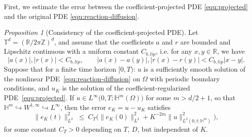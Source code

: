 \documentclass[a4paper,fleqn]{cas-sc}
\theoremstyle{definition}
\theoremstyle{remark}
\newtheorem{proposition}{Proposition}
\begin{document}
First, we estimate the error between the coefficient-projected PDE \eqref{equ:projected} and the original PDE \eqref{equ:reaction-diffusion}.
\begin{proposition}[Consistency of the coefficient-projected PDE]
\label{prop:u_u_K}
Let $\mathbb{T}^d = (\mathbb{R}/2\pi\mathbb{Z})^d$, and assume that the coefficients $a$ and $r$ are bounded and Lipschitz continuous with a uniform constant $C_{b,lip}$, i.e. for any $x, y\in \mathbb R$, we have
    \[
    |a(x)|,|r(x)| < C_{b,lip}, \qquad |a(x)-a(y)|,|r(x)-r(y)| < C_{b,lip} |x-y|.
    \]
    Suppose that for a finite time horizon $[0,T)$: $u$ is a sufficiently smooth solution of the nonlinear PDE~\eqref{equ:reaction-diffusion} on $\Omega$ with periodic boundary conditions, and $u_K$ is the solution of the coefficient-regularized PDE~\eqref{equ:projected}.
If $u\in L^\infty\bigl(0,T;\mathbb H^m(\Omega)\bigr)$ for some $m>d/2+1$, so that $\mathbb H^m\hookrightarrow W^{1,\infty}\hookrightarrow L^\infty$, then the error $e_K=u- u_K$ satisfies
\[
\|e_K(t)\|_{L^2}^2 \;\le\; C_T\Big(\|e_K(0)\|_{L^2}^2 + K^{-2m}\|u\|_{L^2(0,t;\mathbb H^m)}^2\Big),
\]
for some constant $C_T>0$ depending on $T$, $D$,
but independent of $K$.
\end{proposition}
\end{document}
